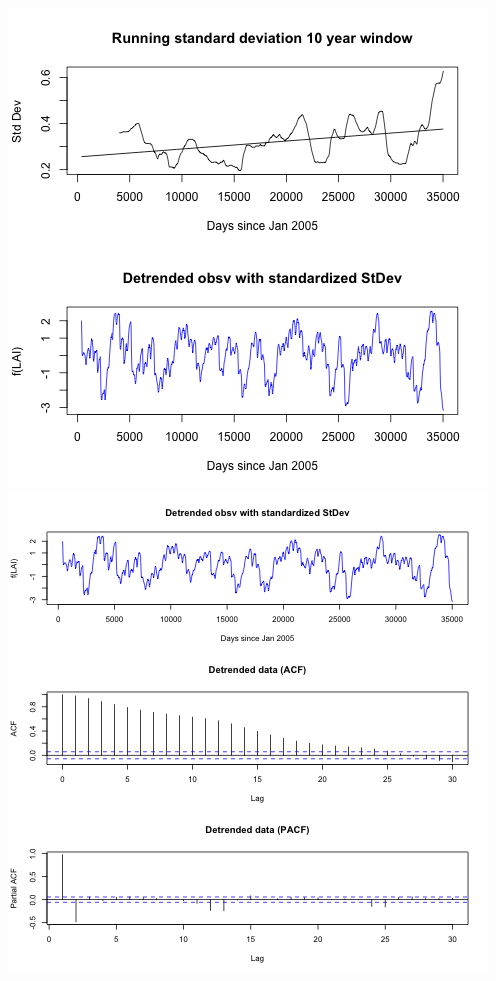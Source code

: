\documentclass[11pt]{article}
\begin{document}
\includegraphics[width=\textwidth]{../img/standatdized_var_LAI.png}
\includegraphics[width=\textwidth]{../img/detrended_stdzd_acf_pacf.png}
\end{document}
